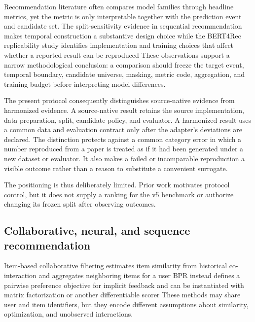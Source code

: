 Recommendation literature often compares model families through headline
metrics, yet the metric is only interpretable together with the prediction
event and candidate set. The split-sensitivity evidence in sequential
recommendation makes temporal construction a substantive design choice
\cite{gusak2025_time_split} %
while the BERT4Rec replicability study identifies implementation and training
choices that affect whether a reported result can be reproduced
\cite{petrov2022_a_systematic_review_and_replicability_study_of_bert4rec_fo} %
These observations support a narrow methodological conclusion: a comparison
should freeze the target event, temporal boundary, candidate universe, masking,
metric code, aggregation, and training budget before interpreting model
differences.

The present protocol consequently distinguishes source-native evidence from
harmonized evidence. A source-native result retains the source implementation,
data preparation, split, candidate policy, and evaluator. A harmonized result
uses a common data and evaluation contract only after the adapter's deviations
are declared. The distinction protects against a common category error in which
a number reproduced from a paper is treated as if it had been generated under a
new dataset or evaluator. It also makes a failed or incomparable reproduction a
visible outcome rather than a reason to substitute a convenient surrogate.

The positioning is thus deliberately limited. Prior work motivates protocol
control, but it does not supply a ranking for the v5 benchmark or authorize
changing its frozen split after observing outcomes.

\subsection{Collaborative, neural, and sequence recommendation}

Item-based collaborative filtering estimates item similarity from historical
co-interaction and aggregates neighboring items for a user
\cite{sarwar2001_itemcf} %
BPR instead defines a pairwise preference objective for implicit feedback and
can be instantiated with matrix factorization or another differentiable
scorer
\cite{rendle2009_bpr} %
These methods may share user and item identifiers, but they encode different
assumptions about similarity, optimization, and unobserved interactions.

